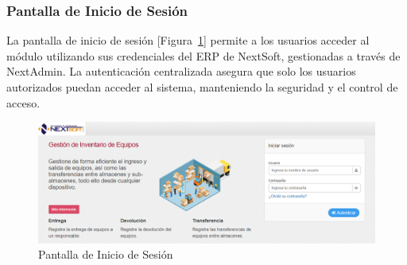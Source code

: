 \documentclass[stu, 12pt, letterpaper, donotrepeattitle, floatsintext, natbib]{apa7}
\begin{document}
\subsubsection{Pantalla de Inicio de Sesi\'on}
La pantalla de inicio de sesi\'on [Figura~\ref{loginProd}] permite a los usuarios acceder al m\'odulo utilizando sus credenciales del ERP de NextSoft, gestionadas a trav\'es de NextAdmin. La autenticaci\'on centralizada asegura que solo los usuarios autorizados puedan acceder al sistema, manteniendo la seguridad y el control de acceso.
\begin{figure}[H]
    \centering
    \caption{Pantalla de Inicio de Sesi\'on}\label{loginProd}
    \includegraphics[width=16.5cm]{./images/loginProd.png}
\end{figure}
\end{document}
